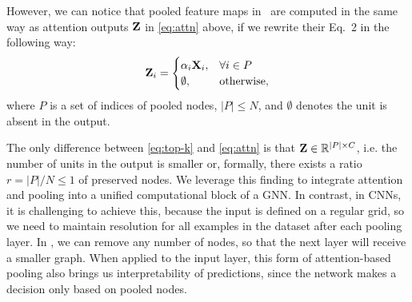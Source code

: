 However, we can notice that pooled feature maps in~\cite[Eq.~2]{graphunet2018} are computed in the same way as attention outputs $\mathbf{Z}$ in \eqref{eq:attn} above, if we rewrite their Eq.~2 in the following way:
%
\begin{equation}
\label{eq:top-k}
\mathbf{Z}_i =
\begin{cases}
\mathbf{\alpha}_i \mathbf{X}_i,& \forall i \in P\\
\emptyset, & \text{otherwise} ,
\end{cases}
\end{equation}
%
where $P$ is a set of indices of pooled nodes, $|P| \leq N$, and $\emptyset$ denotes the unit is absent in the output.

The only difference between \eqref{eq:top-k} and \eqref{eq:attn} is that $\mathbf{Z} \in \mathbb{R}^{|P| \times C}$, i.e. the number of units in the output is smaller or, formally, there exists a ratio $r=|P| / N \leq 1$ of preserved nodes.
We leverage this finding to integrate attention and pooling into a unified computational block of a GNN.
In contrast, in CNNs, it is challenging to achieve this, because the input is defined on a regular grid, so we need to maintain resolution for all examples in the dataset after each pooling layer.
In \gnns, we can remove any number of nodes, so that the next layer will receive a smaller graph. When applied to the input layer, this form of attention-based pooling also brings us interpretability of predictions, since the network makes a decision only based on pooled nodes.

